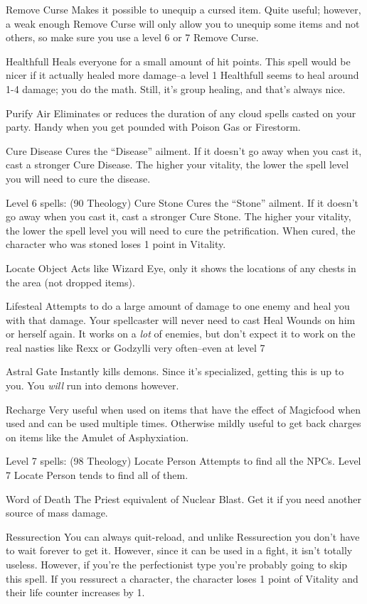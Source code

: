 \documentclass[12pt]{article}
\begin{document}
Remove Curse Makes it possible to unequip a cursed item. Quite useful;
however, a weak enough Remove Curse will only allow you to unequip some
items and not others, so make sure you use a level 6 or 7 Remove Curse.

Healthfull Heals everyone for a small amount of hit points. This spell
would be nicer if it actually healed more damage--a level 1 Healthfull
seems to heal around 1-4 damage; you do the math. Still, it's group
healing, and that's always nice.

Purify Air Eliminates or reduces the duration of any cloud spells casted
on your party. Handy when you get pounded with Poison Gas or Firestorm.

Cure Disease Cures the ``Disease'' ailment. If it doesn't go away when
you cast it, cast a stronger Cure Disease. The higher your vitality, the
lower the spell level you will need to cure the disease.

Level 6 spells: (90 Theology) Cure Stone Cures the ``Stone'' ailment. If
it doesn't go away when you cast it, cast a stronger Cure Stone. The
higher your vitality, the lower the spell level you will need to cure
the petrification. When cured, the character who was stoned loses 1
point in Vitality.

Locate Object Acts like Wizard Eye, only it shows the locations of any
chests in the area (not dropped items).

Lifesteal Attempts to do a large amount of damage to one enemy and heal
you with that damage. Your spellcaster will never need to cast Heal
Wounds on him or herself again. It works on a \emph{lot} of enemies, but
don't expect it to work on the real nasties like Rexx or Godzylli very
often--even at level 7

Astral Gate Instantly kills demons. Since it's specialized, getting this
is up to you. You \emph{will} run into demons however.

Recharge Very useful when used on items that have the effect of
Magicfood when used and can be used multiple times. Otherwise mildly
useful to get back charges on items like the Amulet of Asphyxiation.

Level 7 spells: (98 Theology) Locate Person Attempts to find all the
NPCs. Level 7 Locate Person tends to find all of them.

Word of Death The Priest equivalent of Nuclear Blast. Get it if you need
another source of mass damage.

Ressurection You can always quit-reload, and unlike Ressurection you
don't have to wait forever to get it. However, since it can be used in a
fight, it isn't totally useless. However, if you're the perfectionist
type you're probably going to skip this spell. If you ressurect a
character, the character loses 1 point of Vitality and their life
counter increases by 1.
\end{document}
